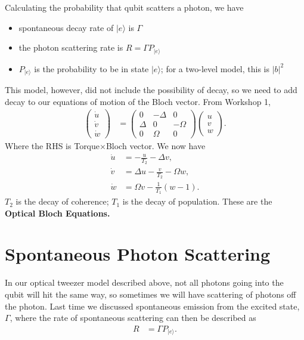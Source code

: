 \documentclass[a4paper, 11pt, normalem]{report}
\begin{document}
Calculating the probability that qubit scatters a photon, we have
\begin{itemize}
    \item spontaneous decay rate of $|e\rangle$ is $\Gamma$
    \item the photon scattering rate is $R=\Gamma P_{|e\rangle}$
    \item $P_{|e\rangle}$ is the probability to be in state $|e\rangle$; for a two-level model, this is $|b|^2$
\end{itemize}
This model, however, did not include the possibility of decay, so we need to add decay to our equations of motion of the Bloch vector.
From Workshop 1,
\begin{align}
    \begin{pmatrix} \dot u \\ \dot v \\ \dot w \end{pmatrix} &= \begin{pmatrix} 0 &-\Delta &0\\ \Delta & 0 & -\Omega \\ 0 & \Omega & 0 \end{pmatrix}\begin{pmatrix}u \\ v \\ w\end{pmatrix}.
\end{align}
Where the RHS is Torque$\times$Bloch vector.
We now have
\begin{align}
    \dot{u} &= -\frac{u}{T_2} - \Delta v, \\
    \dot{v} &= \Delta u - \frac{v}{T_2} - \Omega w, \\
    \dot{w} &= \Omega v - \frac{1}{T_1}(w-1).
\end{align}
$T_2$ is the decay of coherence; $T_1$ is the decay of population.
These are the \textbf{Optical Bloch Equations.}

\chapter{Spontaneous Photon Scattering}
In our optical tweezer model described above, not all photons going into the qubit will hit the same way, so sometimes we will have scattering of photons off the photon.
Last time we discussed spontaneous emission from the excited state, $\Gamma$, where the rate of spontaneous scattering can then be described as
\begin{align}
    R &= \Gamma P_{|e\rangle}.
\end{align}
\end{document}
